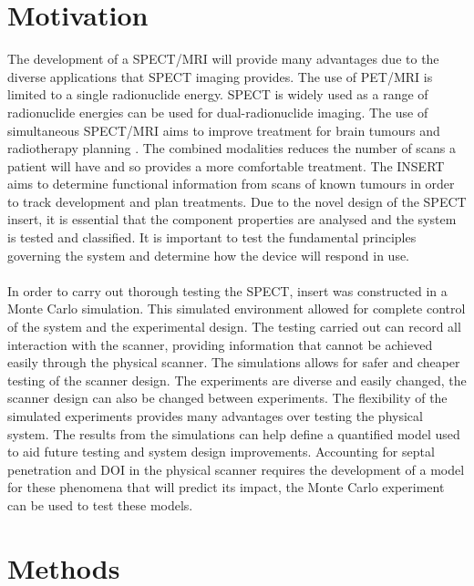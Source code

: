 \section{Motivation}
The development of a SPECT/MRI will provide many advantages due to the diverse applications that SPECT imaging provides. The use of PET/MRI is limited to a single radionuclide energy. SPECT is widely used as a range of radionuclide energies can be used for dual-radionuclide imaging. The use of simultaneous SPECT/MRI aims to improve treatment for brain tumours and radiotherapy planning \cite{doi:10.1259/bjr.20160690}. The combined modalities reduces the number of scans a patient will have and so provides a more comfortable treatment. The INSERT aims to determine functional information from scans of known tumours in order to track development and plan treatments. Due to the novel design of the SPECT insert, it is essential that the component properties are analysed and the system is tested and classified. It is important to test the fundamental principles governing the system and determine how the device will respond in use.
\paragraph{}
In order to carry out thorough testing the SPECT, insert was constructed in a Monte Carlo simulation. This simulated environment allowed for complete control of the system and the experimental design. The testing carried out can record all interaction with the scanner, providing information that cannot be achieved easily through the physical scanner. The simulations allows for safer and cheaper testing of the scanner design. The experiments are diverse and easily changed, the scanner design can also be changed between experiments. The flexibility of the simulated experiments provides many advantages over testing the physical system. The results from the simulations can help define a quantified model used to aid future testing and system design improvements. Accounting for septal penetration and DOI in the physical scanner requires the development of a model for these phenomena that will predict its impact, the Monte Carlo experiment can be used to test these models. 


\section{Methods}

